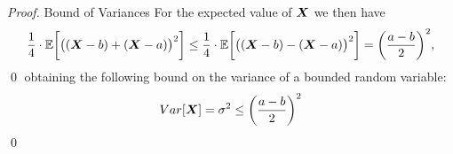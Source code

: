 \begin{proof}{Bound of Variances}
For the expected value of $\boldsymbol{X}$ we then have
\begin{equation*}
    \frac{1}{4} \cdot \mathbb{E}\bigg[\big((\boldsymbol{X} - b) + (\boldsymbol{X} - a)  \big)^2\bigg] \leq \frac{1}{4} \cdot \mathbb{E}\bigg[\big((\boldsymbol{X} - b) - (\boldsymbol{X} - a)\big)^2\bigg] = \bigg(\frac{a-b}{2}\bigg)^2,
\end{equation*}\qed
obtaining the following bound on the variance of a bounded random variable:
\begin{equation}
    Var[\boldsymbol{X}] = \sigma^2 \leq \bigg(\frac{a-b}{2}\bigg)^2
\end{equation}
\qed
\end{proof}

